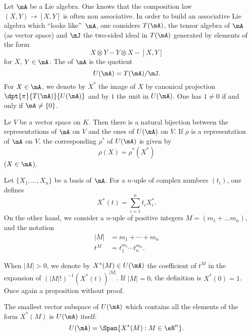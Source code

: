 Let $\mA$ be a Lie algebra. One knows that the composition law $(X,Y)\to[X,Y]$ is often non associative. In order to build an associative Lie algebra which ``looks like''\ $\mA$, one considers $T(\mA)$, the tensor algebra of $\mA$ (as vector space) and $\mJ$ the two-sided ideal in $T(\mA)$ generated by elements of the form
\[
   X\otimes Y-Y\otimes X -[X,Y]
\]
for $X$, $Y\in\mA$. The  of $\mA$ is the quotient 
\begin{equation}
     U(\mA)=T(\mA)/\mJ.
\end{equation}
For $X\in\mA$, we denote by $X^*$ the image of $X$ by canonical projection $\dpt{\pi}{T(\mA)}{U(\mA)}$ and by $1$ the unit in $U(\mA)$. One has $1\neq 0$ if and only if $\mA\neq\{0\}$.

\begin{proposition}
Le $V$ be a vector space on $K$. Then there is a natural bijection between the representations of $\mA$ on $V$ and the ones of $U(\mA)$ on $V$. If $\rho$ is a representation of $\mA$ on $V$, the corresponding $\rho^*$ of $U(\mA)$ is given by
\[
   \rho(X)=\rho^*(X^*)
\]
($X\in\mA$).
\end{proposition}

Let $\{X_1,\ldots,X_n\}$ be a basis of $\mA$. For a $n$-uple of complex numbers $(t_i)$, one defines
\begin{equation}
X^*(t)=\sum_{i=1}^nt_iX^*_i.
\end{equation}
On the other hand, we consider a $n$-uple of positive integers $M=(m_1+\ldots m_n)$, and the notation
\begin{equation}
\begin{split}
   |M|&=m_1+\cdots+m_n\\
   t^M&=t_1^{m_1}\cdots t_n^{m_n}.
\end{split}
\end{equation}

When $|M|>0$, we denote by $X^*(M)\in U(\mA)$ the coefficient of $t^M$ in the expansion of $(|M|!)^{-1} (X^*(t))^{|M|}$. If $|M|=0$, the definition is $X^*(0)=1$. Once again a proposition without proof.

\begin{proposition}
The smallest vector subspace of $U(\mA)$ which contains all the elements of the form $X^*(M)$ is $U(\mA)$ itself:
\[
   U(\mA)=\Span\{ X^*(M):M\in \eN^n \}.
\]
\end{proposition}

